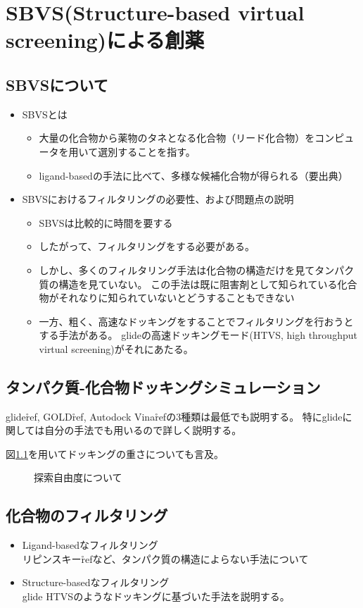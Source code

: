 \chapter{SBVS(Structure-based virtual screening)による創薬}
\section{SBVSについて}
\begin{itemize}
\item SBVSとは
	\begin{itemize}
	\item 大量の化合物から薬物のタネとなる化合物（リード化合物）をコンピュータを用いて選別することを指す。
	\item ligand-basedの手法に比べて、多様な候補化合物が得られる（要出典）
	\end{itemize}
\item SBVSにおけるフィルタリングの必要性、および問題点の説明
	\begin{itemize}
	\item SBVSは比較的に時間を要する
	\item したがって、フィルタリングをする必要がある。
	\item しかし、多くのフィルタリング手法は化合物の構造だけを見てタンパク質の構造を見ていない。
		この手法は既に阻害剤として知られている化合物がそれなりに知られていないとどうすることもできない
	\item 一方、粗く、高速なドッキングをすることでフィルタリングを行おうとする手法がある。
		glideの高速ドッキングモード(HTVS, high throughput virtual screening)がそれにあたる。
	\end{itemize}
\end{itemize}
\section{タンパク質-化合物ドッキングシミュレーション}
glide\r{ref}, GOLD\r{ref}, Autodock Vina\r{ref}の3種類は最低でも説明する。
特にglideに関しては自分の手法でも用いるので詳しく説明する。

図\ref{fig:docking_freedom}を用いてドッキングの重さについても言及。
\begin{figure}[htb]
 \begin{center}
  \caption{探索自由度について}
  \label{fig:docking_freedom}
 \end{center}
\end{figure}

\section{化合物のフィルタリング}
\begin{itemize}
\item Ligand-basedなフィルタリング\\
	リピンスキー\r{ref}など、タンパク質の構造によらない手法について
\item Structure-basedなフィルタリング\\
	glide HTVSのようなドッキングに基づいた手法を説明する。
\end{itemize}